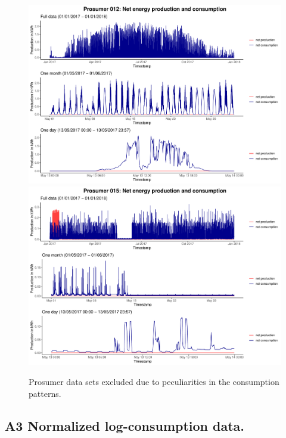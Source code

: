 \begin{centering}
\begin{figure}[H]
        \includegraphics[width=\textwidth-0.85cm]{thesis/graphs/timeseries/p012_prod&cons.pdf}\vspace{0.3cm}
        \includegraphics[width=\textwidth-0.85cm]{thesis/graphs/timeseries/p015_prod&cons.pdf}
        \caption[Prosumer data sets excluded due to peculiarities in the consumption patterns]{Prosumer data sets excluded due to peculiarities in the consumption patterns. \quantnet}
        \label{App:Fig:excludedpros}
\end{figure}
\end{centering}


\subsection*{A3 Normalized log-consumption data.} \label{App:Figures:transform}

